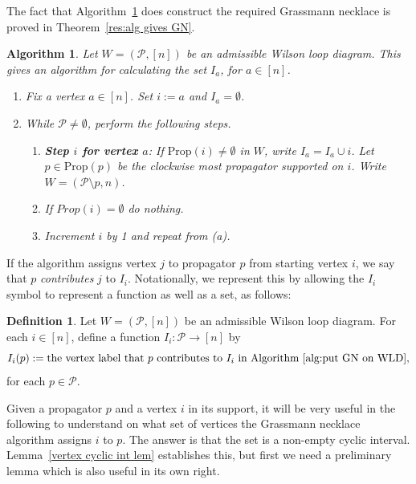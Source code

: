 \documentclass[11pt]{article}
\newcommand{\cP}{\mathcal{P}}
\newcommand{\Prop}{\textrm{Prop}}
\newtheorem{algorithm}[thm]{Algorithm}
\theoremstyle{remark}
\theoremstyle{definition}
\newtheorem{dfn}[thm]{Definition}
\begin{document}
The fact that Algorithm~\ref{alg:put GN on WLD} does construct the required Grassmann necklace is proved in Theorem~\ref{res:alg gives GN}.

\begin{algorithm}\label{alg:put GN on WLD}
Let $W = (\cP, [n])$ be an admissible Wilson loop diagram. This gives an algorithm for calculating the set $I_a$, for $a \in [n]$.

\begin{enumerate}
\item Fix a vertex $a \in [n]$. Set $i:=a$ and $I_a = \emptyset$.
\item While $\cP \neq \emptyset$, perform the following steps.
\begin{enumerate}
\item \textbf{Step $i$ for vertex $a$}: If $\Prop(i) \neq \emptyset$ in $W$, write $I_a = I_a \cup i$. Let $p \in \Prop(p)$ be the clockwise most propagator supported on $i$. Write $W = (\cP \setminus p, n)$.
\item If $Prop(i) = \emptyset$ do nothing.
\item Increment $i$ by 1 and repeat from (a).
\end{enumerate}
\end{enumerate}
\end{algorithm}

If the algorithm assigns vertex $j$ to propagator $p$ from starting vertex $i$, we say that $p$ \emph{contributes} $j$ to $I_i$. Notationally, we represent this by allowing the $I_i$ symbol to represent a function as well as a set, as follows:
\begin{dfn}\label{def I_i as a function}
Let $W = (\cP, [n])$ be an admissible Wilson loop diagram. For each $i \in [n]$, define a function $I_i : \cP \longrightarrow [n]$ by
\[I_i(p) := \text{the vertex label that $p$ contributes to $I_i$ in Algorithm~\ref{alg:put GN on WLD},}\]
for each $p \in \cP$.
\end{dfn}


Given a propagator $p$ and a vertex $i$ in its support, it will be very useful in the following to understand on what set of vertices the Grassmann necklace algorithm assigns $i$ to $p$.  The answer is that the set is a non-empty cyclic interval.  Lemma~\ref{vertex cyclic int lem} establishes this, but first we need a preliminary lemma which is also useful in its own right.
\end{document}
